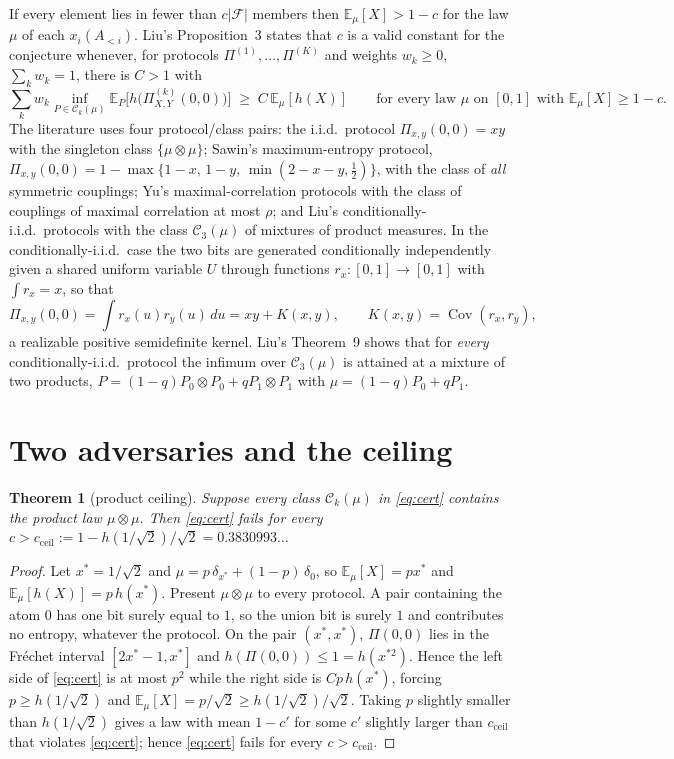 \documentclass[11pt]{article}
\newtheorem{theorem}{Theorem}
\theoremstyle{definition}
\newcommand{\E}{\mathbb{E}}
\newcommand{\F}{\mathcal{F}}
\newcommand{\cC}{\mathcal{C}}
\newcommand{\ent}{h}
\DeclareMathOperator{\Cov}{Cov}
\begin{document}
If every element lies in fewer than $c|\F|$ members then $\E_\mu[X]>1-c$ for the law $\mu$ of each $x_i(A_{<i})$. Liu's Proposition~3 states that $c$ is a valid constant for the conjecture whenever, for protocols $\Pi^{(1)},\dots,\Pi^{(K)}$ and weights $w_k\ge0$, $\sum_kw_k=1$, there is $C>1$ with
\begin{equation}\label{eq:cert}
\sum_{k}w_k\inf_{P\in\cC_k(\mu)}\E_P\big[\ent\big(\Pi^{(k)}_{X,Y}(0,0)\big)\big]\;\ge\;C\,\E_\mu[\ent(X)]\qquad\text{for every law $\mu$ on $[0,1]$ with }\E_\mu[X]\ge1-c .
\end{equation}
The literature uses four protocol/class pairs: the i.i.d.\ protocol $\Pi_{x,y}(0,0)=xy$ with the singleton class $\{\mu\otimes\mu\}$; Sawin's maximum-entropy protocol, $\Pi_{x,y}(0,0)=1-\max\{1-x,\,1-y,\,\min(2-x-y,\tfrac12)\}$, with the class of \emph{all} symmetric couplings; Yu's maximal-correlation protocols with the class of couplings of maximal correlation at most $\rho$; and Liu's conditionally-i.i.d.\ protocols with the class $\cC_3(\mu)$ of mixtures of product measures. In the conditionally-i.i.d.\ case the two bits are generated conditionally independently given a shared uniform variable $U$ through functions $r_x:[0,1]\to[0,1]$ with $\int r_x=x$, so that
\begin{equation}\label{eq:kernel}
\Pi_{x,y}(0,0)=\int r_x(u)r_y(u)\,du=xy+K(x,y),\qquad K(x,y)=\Cov(r_x,r_y),
\end{equation}
a realizable positive semidefinite kernel. Liu's Theorem~9 shows that for \emph{every} conditionally-i.i.d.\ protocol the infimum over $\cC_3(\mu)$ is attained at a mixture of two products, $P=(1-q)P_0\otimes P_0+qP_1\otimes P_1$ with $\mu=(1-q)P_0+qP_1$.

\section{Two adversaries and the ceiling}
\begin{theorem}[product ceiling]\label{thm:ceil}
Suppose every class $\cC_k(\mu)$ in \eqref{eq:cert} contains the product law $\mu\otimes\mu$. Then \eqref{eq:cert} fails for every $c>c_{\mathrm{ceil}}:=1-\ent(1/\sqrt2)/\sqrt2=0.3830993\ldots$
\end{theorem}
\begin{proof}
Let $x^*=1/\sqrt2$ and $\mu=p\,\delta_{x^*}+(1-p)\,\delta_0$, so $\E_\mu[X]=px^*$ and $\E_\mu[\ent(X)]=p\,\ent(x^*)$. Present $\mu\otimes\mu$ to every protocol. A pair containing the atom $0$ has one bit surely equal to $1$, so the union bit is surely $1$ and contributes no entropy, whatever the protocol. On the pair $(x^*,x^*)$, $\Pi(0,0)$ lies in the Fr\'echet interval $[2x^*-1,x^*]$ and $\ent(\Pi(0,0))\le1=\ent(x^{*2})$. Hence the left side of \eqref{eq:cert} is at most $p^2$ while the right side is $Cp\,\ent(x^*)$, forcing $p\ge \ent(1/\sqrt2)$ and $\E_\mu[X]=p/\sqrt2\ge \ent(1/\sqrt2)/\sqrt2$. Taking $p$ slightly smaller than $\ent(1/\sqrt2)$ gives a law with mean $1-c'$ for some $c'$ slightly larger than $c_{\mathrm{ceil}}$ that violates \eqref{eq:cert}; hence \eqref{eq:cert} fails for every $c>c_{\mathrm{ceil}}$.
\end{proof}
\end{document}

